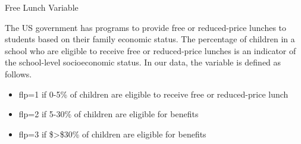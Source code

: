\documentclass[ignorenonframetext,]{beamer}
\newenvironment{Shaded}{\begin{snugshade}}{\end{snugshade}}
\newcommand{\KeywordTok}[1]{\textcolor[rgb]{0.13,0.29,0.53}{\textbf{#1}}}
\newcommand{\DataTypeTok}[1]{\textcolor[rgb]{0.13,0.29,0.53}{#1}}
\newcommand{\DecValTok}[1]{\textcolor[rgb]{0.00,0.00,0.81}{#1}}
\newcommand{\StringTok}[1]{\textcolor[rgb]{0.31,0.60,0.02}{#1}}
\newcommand{\OperatorTok}[1]{\textcolor[rgb]{0.81,0.36,0.00}{\textbf{#1}}}
\newcommand{\NormalTok}[1]{#1}
\providecommand{\tightlist}{%
  \setlength{\itemsep}{0pt}\setlength{\parskip}{0pt}}
\begin{document}
\begin{frame}{Free Lunch Variable}

The US government has programs to provide free or reduced-price lunches
to students based on their family economic status. The percentage of
children in a school who are eligible to receive free or reduced-price
lunches is an indicator of the school-level socioeconomic status. In our
data, the variable is defined as follows.

\begin{itemize}
\tightlist
\item
  flp=1 if 0-5\% of children are eligible to receive free or
  reduced-price lunch
\item
  flp=2 if 5-30\% of children are eligible for benefits
\item
  flp=3 if \$\textgreater{}\$30\% of children are eligible for benefits
\end{itemize}

\end{frame}

\begin{frame}[fragile]{}

\begin{Shaded}
\end{Shaded}

\end{frame}
\end{document}
